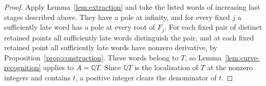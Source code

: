 \begin{proof}
    Apply Lemma~\ref{lem:extraction} and take the listed words of increasing last stages described above.
    They have a pole at infinity, and for every fixed $j$ a sufficiently late word has a pole at every root of $F_j$.
    For each fixed pair of distinct retained points all sufficiently late words distinguish the pair, and at each fixed retained point all sufficiently late words have nonzero derivative, by Proposition~\ref{prop:construction}.
    These words belong to $T$, so Lemma~\ref{lem:curve-recognition} applies to $A = \mathbb{Q}T$.
    Since $\mathbb{Q}T$ is the localization of $T$ at the nonzero integers and contains $t$, a positive integer clears the denominator of $t$.
\end{proof}
